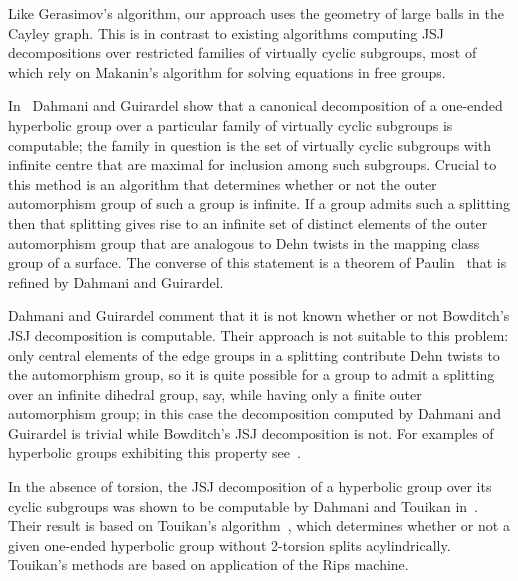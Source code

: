 Like Gerasimov's algorithm, our approach uses the geometry of large balls in the Cayley graph. 
This is in contrast to existing algorithms computing JSJ decompositions over restricted families of virtually cyclic subgroups, most of which rely on Makanin's algorithm for solving equations in free groups.

In~\cite{dahmaniguirardel11} Dahmani and Guirardel show that a canonical decomposition of a one-ended hyperbolic group over a particular family of virtually cyclic subgroups is computable; the family in question is the set of virtually cyclic subgroups with infinite centre that are maximal for inclusion among such subgroups. 
Crucial to this method is an algorithm that determines whether or not the outer automorphism group of such a group is infinite. 
If a group admits such a splitting then that splitting gives rise to an infinite set of distinct elements of the outer automorphism group that are analogous to Dehn twists in the mapping class group of a surface. 
The converse of this statement is a theorem of Paulin~\cite{paulin91} that is refined by Dahmani and Guirardel.

Dahmani and Guirardel comment that it is not known whether or not Bowditch's JSJ decomposition is computable. 
Their approach is not suitable to this problem: only central elements of the edge groups in a splitting contribute Dehn twists to the automorphism group, so it is quite possible for a group to admit a splitting over an infinite dihedral group, say, while having only a finite outer automorphism group; in this case the decomposition computed by Dahmani and Guirardel is trivial while Bowditch's JSJ decomposition is not. 
For examples of hyperbolic groups exhibiting this property see~\cite{millerneumannswarup96}. 

In the absence of torsion, the JSJ decomposition of a hyperbolic group over its cyclic subgroups was shown to be computable by Dahmani and Touikan in~\cite{dahmanitouikan13}. 
Their result is based on Touikan's algorithm~\cite{touikan09}, which determines whether or not a given one-ended hyperbolic group without 2-torsion splits acylindrically. 
Touikan's methods are based on application of the Rips machine.

